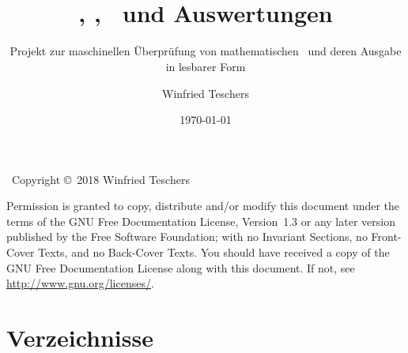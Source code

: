 \titlehead{
	{\Large Dr. Winfried Teschers}\\
	Anton-Günther-Straße 26c\\91083 Baiersdorf\\
	{\footnotesize winfried.teschers@t-online.de}
}
\subject{Projektdokument}
\title{{\Huge \ASBA}\\\Axiome, \Saetze, \Beweise\ und Auswertungen}
\subtitle{Projekt zur maschinellen Überprüfung von mathematischen \Beweisen\ und deren Ausgabe in lesbarer Form}
\author{Winfried Teschers}
\date{\today}
\publishers{\vspace{1cm}\normalsize
	Es wird ein Programmsystem beschrieben, das zu eingegebenen \Axiomen, \Saetzen\ und \Beweisen\ letztere prüft, Auswertungen generiert und unter Zuhilfenahme gegebener \Ausgabeschemata\ eine Ausgabe im \LaTeX-Format in mathematisch üblicher Schreibweise mit \Formeln\ erstellt.
}



	\maketitle
	~\vfill Copyright \copyright\ 2018 Winfried Teschers\bigskip

	\begin{otherlanguage}{english}
		Permission is granted to copy, distribute and/or modify this document under the terms of the GNU Free Documentation License, Version~1.3 or any later version published by the Free Software Foundation; with no Invariant Sections, no Front-Cover Texts, and no Back-Cover Texts.
		You should have received a copy of the GNU Free Documentation License along with this document.
		If not, see \url{http://www.gnu.org/licenses/}.
	\end{otherlanguage}

	\tableofcontents
	\Endchapter

	
	
	
	\color{gray}%
	
	\color{black}%
	
	

	\chapter     {Verzeichnisse}%
	\label   {app-Verzeichnisse}

